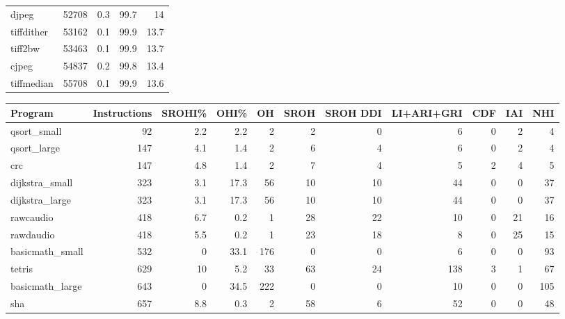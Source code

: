 \begin{tabular}{lrrrr}
 djpeg           &   52708 &    0.3 &         99.7 &    14   \\
 tiffdither      &   53162 &    0.1 &         99.9 &    13.7 \\
 tiff2bw         &   53463 &    0.1 &         99.9 &    13.7 \\
 cjpeg           &   54837 &    0.2 &         99.8 &    13.4 \\
 tiffmedian      &   55708 &    0.1 &         99.9 &    13.6 \\
\hline
\end{tabular}\begin{tabular}{lrrrrrrrrrr}
\hline
 Program         &   Instructions &   SROHI\% &   OHI\% &   OH &   SROH &   SROH DDI &   LI+ARI+GRI &   CDF &   IAI &   NHI \\
\hline
 qsort\_small     &             92 &      2.2 &    2.2 &    2 &      2 &          0 &            6 &     0 &     2 &     4 \\
 qsort\_large     &            147 &      4.1 &    1.4 &    2 &      6 &          4 &            6 &     0 &     2 &     4 \\
 crc             &            147 &      4.8 &    1.4 &    2 &      7 &          4 &            5 &     2 &     4 &     5 \\
 dijkstra\_small  &            323 &      3.1 &   17.3 &   56 &     10 &         10 &           44 &     0 &     0 &    37 \\
 dijkstra\_large  &            323 &      3.1 &   17.3 &   56 &     10 &         10 &           44 &     0 &     0 &    37 \\
 rawcaudio       &            418 &      6.7 &    0.2 &    1 &     28 &         22 &           10 &     0 &    21 &    16 \\
 rawdaudio       &            418 &      5.5 &    0.2 &    1 &     23 &         18 &            8 &     0 &    25 &    15 \\
 basicmath\_small &            532 &      0   &   33.1 &  176 &      0 &          0 &            6 &     0 &     0 &    93 \\
 tetris          &            629 &     10   &    5.2 &   33 &     63 &         24 &          138 &     3 &     1 &    67 \\
 basicmath\_large &            643 &      0   &   34.5 &  222 &      0 &          0 &           10 &     0 &     0 &   105 \\
 sha             &            657 &      8.8 &    0.3 &    2 &     58 &          6 &           52 &     0 &     0 &    48 \\

\end{tabular}
